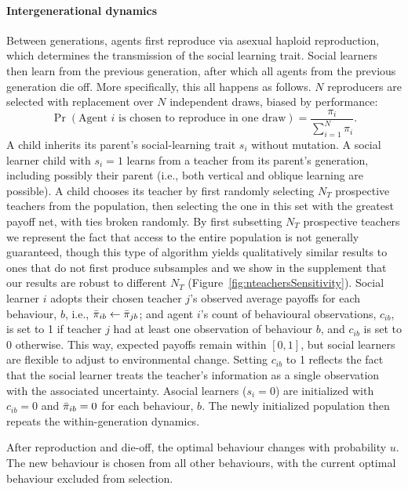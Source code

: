 \documentclass[letterpaper,11.5pt]{scrartcl}
\begin{document}
\paragraph{Intergenerational dynamics} Between generations, agents first reproduce
via asexual haploid reproduction, which determines the transmission of the social
learning trait. Social learners then learn from the previous generation, after which
all agents from the previous generation die off. %
More
specifically, this all happens as follows.  $N$ reproducers are selected with
replacement over $N$ independent draws, biased by performance: 
\begin{equation}
  \Pr(\text{Agent $i$ is chosen to reproduce in one draw}) =
\frac{\pi_i}{\sum_{i=1}^N \pi_i}.  
\end{equation} 
\noindent 
A child inherits its parent's social-learning trait $s_i$ without mutation.  A social learner child with $s_i = 1$ learns from a teacher from its parent's generation, including possibly their parent (i.e., both vertical and oblique learning are possible).  A child chooses its teacher by first randomly selecting $N_T$ prospective teachers from the population, then selecting the one in this set with the greatest payoff net, with ties broken randomly. By first subsetting $N_T$ prospective teachers we represent the fact that access to the entire population is not generally guaranteed, though this type of algorithm yields qualitatively similar results to ones that do not first produce subsamples \citep{smaldino2019open} and we show in the supplement that our results are robust to different $N_T$
(Figure~\ref{fig:nteachersSensitivity}). Social learner $i$ adopts their chosen 
teacher $j$'s observed average payoffs for each behaviour, $b$, i.e., 
$\bar\pi_{ib} \leftarrow \bar\pi_{jb}$; 
and agent $i$'s count of behavioural observations, $c_{ib}$, is set to 1 if teacher $j$ had at least
one observation of behaviour $b$, and $c_{ib}$ is set to 0 otherwise. This way, expected payoffs
remain within $[0, 1]$, but social learners are flexible to adjust to environmental change. Setting
$c_{ib}$ to 1 reflects the fact that the social learner treats the teacher's information as a single
observation with the associated uncertainty. Asocial learners ($s_i = 0$) are initialized with
$c_{ib} = 0$ and $\bar\pi_{ib} = 0$ for each behaviour, $b$. %
The newly initialized population then repeats the within-generation dynamics. 

After reproduction and die-off, the optimal behaviour changes with probability
$u$. The new behaviour is chosen from all other behaviours, with the 
current optimal behaviour excluded from selection.
\end{document}
